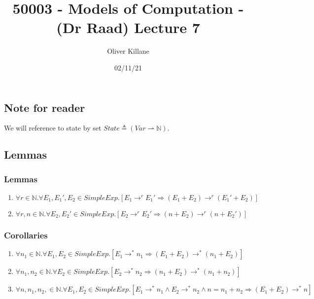 \documentclass{report}
\title{50003 - Models of Computation - (Dr Raad) Lecture 7}
\author{Oliver Killane}
\date{02/11/21}
\begin{document}
\maketitle
{}

\subsection*{Note for reader}
We will reference to state by set $State \triangleq (Var \rightharpoonup \mathbb{N})$.

\subsection*{Lemmas}
\subsubsection*{Lemmas}
\begin{enumerate}
	\item $\forall r \in \mathbb{N}. \forall E_1,E_1',E_2 \in SimpleExp. [E_1 \to^r E_1' \Rightarrow (E_1 + E_2) \to^r (E_1' + E_2)]$
	\item $\forall r,n \in \mathbb{N}. \forall E_2,E_2' \in SimpleExp . [E_2 \to^r E_2' \Rightarrow (n + E_2) \to^r (n + E_2')]$
\end{enumerate}
\subsubsection*{Corollaries}
\begin{enumerate}
	\item $\forall n_1 \in \mathbb{N} . \forall E_1, E_2 \in SimpleExp . [E_1 \to^* n_1 \Rightarrow (E_1 + E_2) \to^* (n_1 + E_2)]$
	\item $\forall n_1, n_2 \in \mathbb{N} . \forall E_2 \in SimpleExp . [E_2 \to^* n_2 \Rightarrow (n_1 + E_2) \to^* (n_1 + n_2)]$
	\item $\forall n,n_1, n_2, \in \mathbb{N} . \forall E_1, E_2 \in SimpleExp . [E_1 \to^* n_1 \land E_2 \to^* n_2 \land n = n_1 + n_2 \Rightarrow (E_1 + E_2) \to^* n]$
\end{enumerate}
\end{document}
